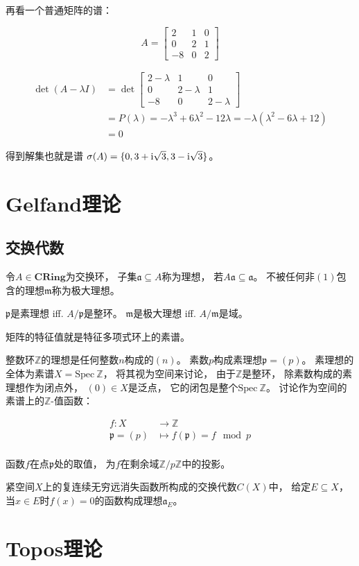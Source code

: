 \documentclass[10pt, openany]{book}
\begin{document}
再看一个普通矩阵的谱：

$$
A = \begin{bmatrix}
  2 & 1 & 0 \\
  0 & 2 & 1 \\
  -8 & 0 & 2
\end{bmatrix}
$$

$$
\begin{aligned}
\det (A - \lambda I)
&=\det \begin{bmatrix}
  2 - \lambda & 1 & 0 \\
  0 & 2 - \lambda & 1 \\
  -8 & 0 & 2 - \lambda
\end{bmatrix} \\
&=P(\lambda)
=-\lambda^3 + 6\lambda^2 - 12\lambda
=-\lambda(\lambda^2 - 6\lambda + 12) \\
&=0
\end{aligned}
$$

得到解集也就是谱
$\sigma(A) = \{ 0, 3 + \text i\sqrt{3}, 3 - \text i\sqrt{3}\}$。

\chapter{Gelfand理论}

\section{交换代数}

令$A\in\textbf{CRing}$为交换环，
子集$\mathfrak a \subseteq A$称为理想，
若$A \mathfrak a \subseteq \mathfrak a$。
不被任何非$(1)$包含的理想$\mathfrak m$称为极大理想。

$\mathfrak p$是素理想 iff. $A/\mathfrak p$是整环。
$\mathfrak m$是极大理想 iff. $A/\mathfrak m$是域。

矩阵的特征值就是特征多项式环上的素谱。

整数环$\mathbb Z$的理想是任何整数$n$构成的$(n)$。
素数$p$构成素理想$\mathfrak p = (p)$。
素理想的全体为素谱$X = \text{Spec} \ \mathbb Z$，
将其视为空间来讨论，
由于$\mathbb Z$是整环，
除素数构成的素理想作为闭点外，
$(0)\in X$是泛点，
它的闭包是整个$\text{Spec} \ \mathbb Z$。
讨论作为空间的素谱上的$\mathbb Z$-值函数：

$$
\begin{aligned}
f: X &\to \mathbb Z \\
\mathfrak p = (p) &\mapsto f(\mathfrak p) = f \mod p \\
\end{aligned}
$$

函数$f$在点$\mathfrak p$处的取值，
为$f$在剩余域$\mathbb Z/p\mathbb Z$中的投影。

紧空间$X$上的复连续无穷远消失函数所构成的交换代数$C(X)$中，
给定$E \subseteq X$，
当$x\in E$时$f(x) = 0$的函数构成理想$\mathfrak a_E$。


\chapter{Topos理论}
\end{document}
